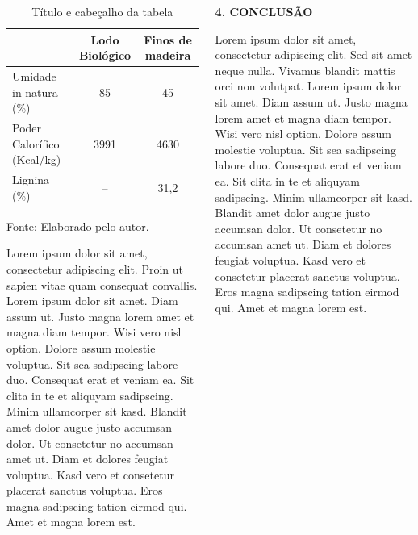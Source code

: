 \documentclass[final]{beamer}
\begin{document}
\begin{frame}[t]
\begin{columns}[t,totalwidth=0.6\paperwidth]
\begin{column}{0.45\paperwidth}
    \vspace{1cm}
    \centering
    
\begin{table}[H]
    \caption{Título e cabeçalho da tabela}
    \setlength{\tabcolsep}{8pt}
    \renewcommand{\arraystretch}{1.25}
    \centering
    \begin{tabular}{>{\RaggedRight}p{8.2cm}cc}
      \toprule
      & \textbf{Lodo Biológico} & \textbf{Finos de madeira}\\
      \midrule
      Umidade in natura (\%)      & 85   & 45   \\
      Poder Calorífico (Kcal/kg)  & 3991 & 4630 \\
      Lignina (\%)                & --   & 31{,}2\\
      \bottomrule
    \end{tabular}
    \par\smallskip
    \raggedright\footnotesize 
    \centering Fonte: Elaborado pelo autor. %
    \normalsize
    \label{tab:caracteristicas}
\end{table}


    \vspace{1em}
    \justifying
    Lorem ipsum dolor sit amet, consectetur adipiscing elit. Proin ut
    sapien vitae quam consequat convallis.
  Lorem ipsum dolor sit amet. Diam assum ut. Justo magna lorem amet et magna diam tempor. Wisi vero nisl option. Dolore assum molestie voluptua. Sit sea sadipscing labore duo. Consequat erat et veniam ea. Sit clita in te et aliquyam sadipscing. Minim ullamcorper sit kasd. Blandit amet dolor augue justo accumsan dolor. Ut consetetur no accumsan amet ut. Diam et dolores feugiat voluptua. Kasd vero et consetetur placerat sanctus voluptua. Eros magna sadipscing tation eirmod qui. Amet et magna lorem est.\\

    

  \end{column}
  \hspace{0.02\paperwidth} 

  \begin{column}{0.45\textwidth}
 
    {\large\bfseries 4. CONCLUSÃO}\par
    \justifying
     \vspace{1.3cm}
    Lorem ipsum dolor sit amet, consectetur adipiscing elit. Sed sit amet
    neque nulla. Vivamus blandit mattis orci non volutpat. Lorem ipsum dolor sit amet. Diam assum ut. Justo magna lorem amet et magna diam tempor. Wisi vero nisl option. Dolore assum molestie voluptua. Sit sea sadipscing labore duo. Consequat erat et veniam ea. Sit clita in te et aliquyam sadipscing. Minim ullamcorper sit kasd. Blandit amet dolor augue justo accumsan dolor. Ut consetetur no accumsan amet ut. Diam et dolores feugiat voluptua. Kasd vero et consetetur placerat sanctus voluptua. Eros magna sadipscing tation eirmod qui. Amet et magna lorem est.


\end{column}
\end{columns}
\end{frame}
\end{document}
